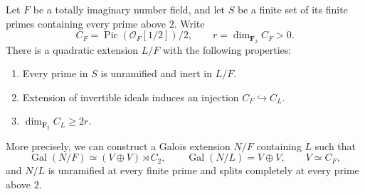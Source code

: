 \begin{lemma}
\label{C:A2-quadratic-step}
Let $F$ be a totally imaginary number field, and let $S$ be a finite
set of its finite primes containing every prime above $2$. Write
\[
 C_F=\operatorname{Pic}(\mathcal O_F[1/2])/2,
 \qquad r=\dim_{\mathbf F_2} C_F>0.
\]
There is a quadratic extension $L/F$ with the following properties:
\begin{enumerate}
 \item Every prime in $S$ is unramified and inert in $L/F$.
 \item Extension of invertible ideals induces an injection
       $C_F\hookrightarrow C_L$.
 \item $\dim_{\mathbf F_2}C_L\ge 2r$.
\end{enumerate}
More precisely, we can construct a Galois extension $N/F$ containing
$L$ such that
\[
 \operatorname{Gal}(N/F)\simeq (V\oplus V)\rtimes C_2,
 \qquad \operatorname{Gal}(N/L)=V\oplus V,
 \qquad V\simeq C_F,
\]
and $N/L$ is unramified at every finite prime and splits completely
at every prime above $2$.
\end{lemma}
